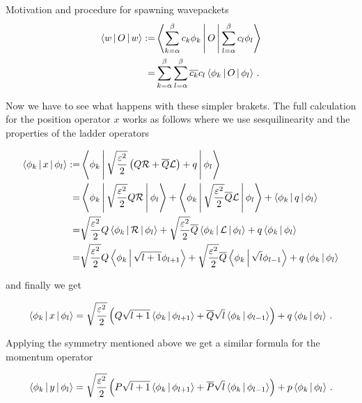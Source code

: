 \begin{chapter}{Motivation and procedure for spawning wavepackets}
\begin{equation}
\label{eq:operator_expectation}
\begin{split}
  \Braket{w | O | w} := & \Braket{\sum_{k=\alpha}^\beta c_k \phi_k | O | \sum_{l=\alpha}^\beta c_l \phi_l} \\
                            = & \sum_{k=\alpha}^{\beta} \sum_{l=\alpha}^{\beta} \overline{c_k} c_l \Braket{\phi_k | O | \phi_l} \,.
\end{split}
\end{equation}

Now we have to see what happens with these simpler brakets. The full calculation
for the position operator $x$ works as follows where we use sesquilinearity and the
properties of the ladder operators

\begin{equation*}
\begin{split}
  \Braket{\phi_k | x | \phi_l}
  := & \Braket{\phi_k | \sqrt{\frac{\varepsilon^2}{2}} \left(Q \mathcal{R} + \overline{Q} \mathcal{L}\right) + q | \phi_l} \\
  = & \Braket{\phi_k | \sqrt{\frac{\varepsilon^2}{2}} Q \mathcal{R} | \phi_l}
    + \Braket{\phi_k | \sqrt{\frac{\varepsilon^2}{2}} \overline{Q} \mathcal{L} | \phi_l}
    + \Braket{\phi_k | q | \phi_l} \\
  = & \sqrt{\frac{\varepsilon^2}{2}} Q \Braket{\phi_k | \mathcal{R} | \phi_l}
    + \sqrt{\frac{\varepsilon^2}{2}} \overline{Q} \Braket{\phi_k | \mathcal{L} | \phi_l}
    + q \Braket{\phi_k | \phi_l} \\
  = & \sqrt{\frac{\varepsilon^2}{2}} Q \Braket{\phi_k | \sqrt{l+1} \phi_{l+1}}
    + \sqrt{\frac{\varepsilon^2}{2}} \overline{Q} \Braket{\phi_k | \sqrt{l} \phi_{l-1}}
    + q \Braket{\phi_k | \phi_l}
\end{split}
\end{equation*}

and finally we get

\begin{equation}
  \label{eq:estimate_pos_basis}
  \Braket{\phi_k | x | \phi_l}
  = \sqrt{\frac{\varepsilon^2}{2}} \left( Q \sqrt{l+1} \Braket{\phi_k | \phi_{l+1}}
    + \overline{Q} \sqrt{l} \Braket{\phi_k | \phi_{l-1}} \right)
    + q \Braket{\phi_k | \phi_l} \,.
\end{equation}

Applying the symmetry mentioned above we get a similar formula for the momentum
operator

\begin{equation}
  \label{eq:estimate_mom_basis}
  \Braket{\phi_k | y | \phi_l}
  = \sqrt{\frac{\varepsilon^2}{2}} \left( P \sqrt{l+1} \Braket{\phi_k | \phi_{l+1}}
    + \overline{P} \sqrt{l} \Braket{\phi_k | \phi_{l-1}} \right)
    + p \Braket{\phi_k | \phi_l} \,.
\end{equation}


\end{chapter}
